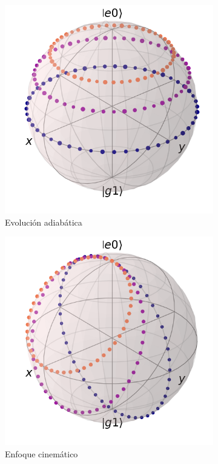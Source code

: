 \begin{figure}[H]
    \centering
    \begin{subfigure}[h]{0.49\textwidth}
        \centering
        \includegraphics[width=\textwidth]{figuras/ch3/bloch berry.png}
        \caption{Evolución adiabática} 
        \label{fig3:bloch berry}
    \end{subfigure}
    \hfill
    \begin{subfigure}[h]{0.49\textwidth}
        \centering
        \includegraphics[width=\textwidth]{figuras/ch3/bloch cinematica.png}
        \caption{Enfoque cinemático}
        \label{fig3:bloch cinematica}
    \end{subfigure}
    \caption{}
    \label{fig3:esfera de bloch jcm}
\end{figure}
